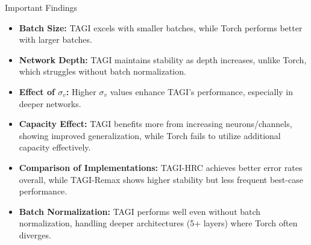 \documentclass[final]{beamer}
\begin{document}
\begin{frame}[t]
\begin{columns}
\begin{column}[T]{.31\textwidth}
\begin{block}{Important Findings}
\begin{itemize}
    \item \textbf{Batch Size:} TAGI excels with smaller batches, while Torch performs better with larger batches.
    \item \textbf{Network Depth:} TAGI maintains stability as depth increases, unlike Torch, which struggles without batch normalization.
    \item \textbf{Effect of $\sigma_v$:} Higher $\sigma_v$ values enhance TAGI's performance, especially in deeper networks.
    \item \textbf{Capacity Effect:} TAGI benefits more from increasing neurons/channels, showing improved generalization, while Torch fails to utilize additional capacity effectively.
    \item \textbf{Comparison of Implementations:} TAGI-HRC achieves better error rates overall, while TAGI-Remax shows higher stability but less frequent best-case performance.
    \item \textbf{Batch Normalization:} TAGI performs well even without batch normalization, handling deeper architectures (5+ layers) where Torch often diverges.
\end{itemize}
\end{block}


\end{column}
\end{columns}
\end{frame}
\end{document}
